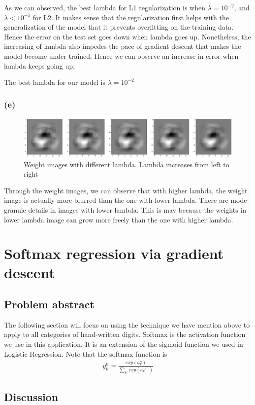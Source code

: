 \documentclass{article}
\begin{document}
As we can observed, the best lambda for L1 regularization is when $\lambda = 10^{-2}$, and $\lambda < 10^{-1}$ for L2. It makes sense that the regularization first helps with the generalization of the model that it prevents overfitting on the training data. Hence the error on the test set goes down when lambda goes up. Nonetheless, the increasing of lambda also impedes the pace of gradient descent that makes the model become under-trained. Hence we can observe an increase in error when lambda keeps going up.

The best lambda for our model is $\lambda=10^{-2}$ 
\subsubsection*{(e)}
\begin{figure}[h]
	\centering
	\includegraphics[width=\textwidth]{pics/weight_img.png}
	\caption{Weight images with different lambda. Lambda increases from left to right}
\end{figure}
Through the weight images, we can observe that with higher lambda, the weight image is actually more blurred than the one with lower lambda. There are mode granule details in images with lower lambda. This is may because the weights in lower lambda image can grow more freely than the one with higher lambda.
\section{Softmax regression via gradient descent}
\subsection{Problem abstract}
The following section will focus on using the technique we have mention above to apply to all categories of hand-written digits. Softmax is the activation function we use in this application. It is an extension of the sigmoid function we used in Logistic Regression. Note that the softmax function is \begin{align*}
y_k^n =\frac{exp(a_k^n)}{\sum_{k'} exp(a_k'^n )}
\end{align*}

\subsection{Discussion}
\end{document}
